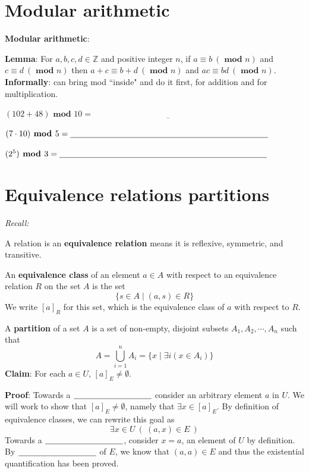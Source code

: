 \documentclass[12pt, oneside]{article}
\begin{document}
\section*{Modular arithmetic}


{\bf Modular arithmetic}: 

{\bf Lemma}: For $a, b, c, d \in \mathbb{Z}$ 
and positive integer $n$, if $a \equiv b ~(\textbf{ mod } n)$ and $c \equiv d ~(\textbf{ mod } n)$ 
then $a+c \equiv b+d ~(\textbf{ mod } n)$ and $ac \equiv bd ~(\textbf{ mod } n)$.
{\bf Informally}: can bring mod ``inside" and do it first, for addition and for multiplication.


$(102 + 48) \textbf{ mod } 10 = \underline{\phantom{\hspace{3in}}} $ 

$(7 \cdot 10) \textbf{ mod } 5 = \underline{\phantom{\hspace{3.3in}}} $ 

$(2^5) \textbf{ mod } 3 =  \underline{\phantom{\hspace{3.45in}}} $ 

\vfill

 \vfill
\section*{Equivalence relations partitions}


{\it Recall:} 


A relation is an {\bf equivalence relation} means it is reflexive, symmetric, and transitive. 

An {\bf equivalence class} of an element $a \in A$ 
with respect to an equivalence relation $R$ on the set $A$ is the set 
\[
    \{s \in A \mid (a, s) \in R \}
\] 
We write $[a]_R$ for this set, which is the equivalence class of $a$ with respect to $R$. 

A {\bf partition} of a set $A$ is a set of non-empty, disjoint subsets 
$A_1, A_2, \cdots, A_n$ such that 
\[
    A = \bigcup_{i=1}^{n} A_i = \{ x \mid \exists i (x \in A_i) \}
\] 
{\bf Claim}: For each  $a \in U$, $[a]_{E}  \neq  \emptyset$.

{\bf Proof}: Towards a $\underline{\phantom{\hspace{1.3in}}}$ 
consider an arbitrary element $a$ in $U$. 
We will work to show that $[a]_E \neq \emptyset$, namely that $\exists x \in [a]_E$.
By definition of equivalence classes, we can rewrite this goal as 
$$\exists x \in U ~( ~(a,x) \in E~)$$ 
Towards a $\underline{\phantom{\hspace{1.3in}}}$, consider $x = a$, 
an element of $U$ by definition. By $\underline{\phantom{\hspace{1.3in}}}$ of $E$, 
we know that $(a,a) \in E$  and thus the existential quantification has been proved.\\
\end{document}
